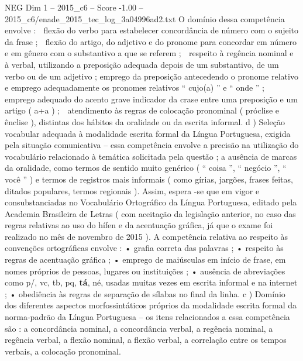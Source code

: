 \begin{textsample}{NEG Dim 1 – 2015\_c6 – Score -1.00 – 2015\_c6/enade\_2015\_tec\_log\_3a04996ad2.txt}
O domínio dessa competência envolve :  flexão do verbo para estabelecer concordância de número com o sujeito da frase ;  flexão do artigo, do adjetivo e do pronome para concordar em número e em gênero com o substantivo a que se referem ;  respeito à regência nominal e à verbal, utilizando a preposição adequada depois de um substantivo, de um verbo ou de um adjetivo ; emprego da preposição antecedendo o pronome relativo e emprego adequadamente os pronomes relativos “ cujo(a) ” e “ onde ” ;  emprego adequado do acento grave indicador da crase entre uma preposição e um artigo ( a+a ) ;  atendimento às regras de colocação pronominal ( próclise e ênclise ), distintas dos hábitos da oralidade ou da escrita informal. d ) Seleção vocabular adequada à modalidade escrita formal da Língua Portuguesa, exigida pela situação comunicativa – essa competência envolve a precisão na utilização do vocabulário relacionado à temática solicitada pela questão ; a ausência de marcas da oralidade, como termos de sentido muito genérico ( “ coisa ”, “ negócio ”, “ você ” ) e termos de registros mais informais ( como gírias, jargões, frases feitas, ditados populares, termos regionais ).
Assim, espera -se que em vigor e consubstanciadas no Vocabulário Ortográfico da Língua Portuguesa, editado pela Academia Brasileira de Letras ( com aceitação da legislação anterior, no caso das regras relativas ao uso do hífen e da acentuação gráfica, já que o exame foi realizado no mês de novembro de 2015 ).
A competência relativa ao respeito às convenções ortográficas envolve : • grafia correta das palavras ; • respeito às regras de acentuação gráfica ; • emprego de maiúsculas em início de frase, em nomes próprios de pessoas, lugares ou instituições ; • ausência de abreviações como p/, vc, tb, pq, \textbf{tá}, né, usadas muitas vezes em escrita informal e na internet ; • obediência às regras de separação de sílabas no final da linha. c ) Domínio dos diferentes aspectos morfossintáticos próprios da modalidade escrita formal da norma-padrão da Língua Portuguesa – os itens relacionados a essa competência são : a concordância nominal, a concordância verbal, a regência nominal, a regência verbal, a flexão nominal, a flexão verbal, a correlação entre os tempos verbais, a colocação pronominal.

\end{textsample}
